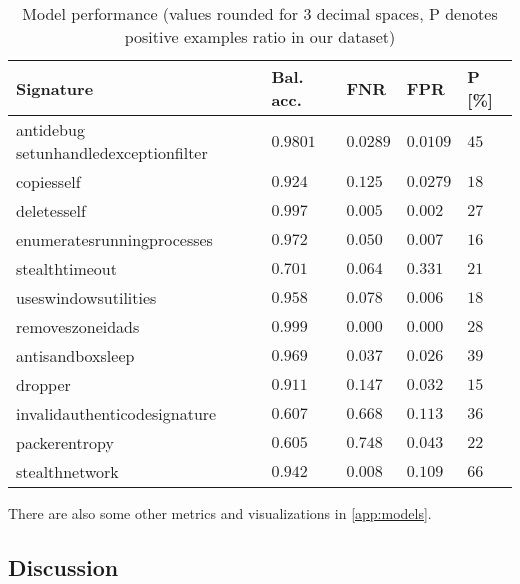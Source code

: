 \begin{table}[h]
  \centering
  \caption{Model performance (values rounded for 3 decimal spaces, P denotes positive examples ratio in our dataset)}
  \begin{tabular}{lllll}
      \toprule
      \textbf{Signature} &
      \textbf{Bal. acc.} &
      \textbf{FNR} &
      \textbf{FPR} &
      \textbf{P [\%]}
      \\
      \midrule
      antidebug setunhandledexceptionfilter & $0.9801$ & $0.0289$ & $0.0109$ & $45$ \\
      \midrule
      copiesself & $0.924$ & $0.125$ & $0.0279$ & $18$ \\
      \midrule
      deletesself & $0.997$ & $0.005$ & $0.002$ & $27$ \\
      \midrule
      enumeratesrunningprocesses & $0.972$ & $0.050$ & $0.007$ & $16$ \\
      \midrule
      stealthtimeout & $0.701$ & $0.064$ & $0.331$ & $21$ \\
      \midrule
      useswindowsutilities & $0.958$ & $0.078$ & $0.006$ & $18$ \\
      \midrule
      removeszoneidads & $0.999$ & $0.000$ & $0.000$ & $28$ \\
      \midrule[0.3pt]
      \midrule[0.3pt]
      antisandboxsleep & $0.969$ & $0.037$ & $0.026$ & $39$ \\
      \midrule
      dropper & $0.911$ & $0.147$ & $0.032$ & $15$ \\
      \midrule
      invalidauthenticodesignature & $0.607$ & $0.668$ & $0.113$ & $36$ \\
      \midrule
      packerentropy & $0.605$ & $0.748$ & $0.043$ & $22$ \\
      \midrule
      stealthnetwork & $0.942$ & $0.008$ & $0.109$ & $66$ \\
      \bottomrule
  \end{tabular}
  \label{tab:models_res}
\end{table}

There are also some other metrics and visualizations in \ref{app:models}.

\subsection{Discussion}
